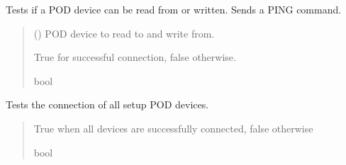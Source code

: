 \documentclass[letterpaper,10pt,english]{sphinxmanual}
\begin{document}
\begin{fulllineitems}
\begin{fulllineitems}
\label{\detokenize{Setup.SetupOneDevice:Setup.SetupOneDevice.Setup_PodInterface.SetupInterface._TestDeviceConnection}}
\pysigstartsignatures
{}
\pysigstopsignatures
\sphinxAtStartPar
Tests if a POD device can be read from or written. Sends a PING command.
\begin{quote}\begin{description}
\sphinxAtStartPar
{} () \textendash{} POD device to read to and write from.

\sphinxAtStartPar
True for successful connection, false otherwise.

\sphinxAtStartPar
bool

\end{description}\end{quote}

\end{fulllineitems}


\begin{fulllineitems}
\label{\detokenize{Setup.SetupOneDevice:Setup.SetupOneDevice.Setup_PodInterface.SetupInterface._TestDeviceConnection_All}}
\pysigstartsignatures
{}
\pysigstopsignatures
\sphinxAtStartPar
Tests the connection of all setup POD devices.
\begin{quote}\begin{description}
\sphinxAtStartPar
True when all devices are successfully connected, false otherwise

\sphinxAtStartPar
bool

\end{description}\end{quote}


\end{fulllineitems}
\end{fulllineitems}
\end{document}

